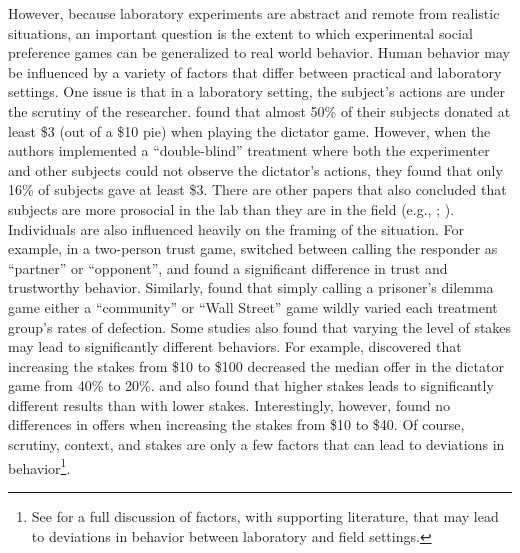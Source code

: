 \documentclass[12pt]{article}
\begin{document}
However, because laboratory experiments are abstract and remote from realistic situations, an important question is the extent to which experimental social preference games can be generalized to real world behavior. Human behavior may be influenced by a variety of factors that differ between practical and laboratory settings. One issue is that in a laboratory setting, the subject's actions are under the scrutiny of the researcher. \cite{hoffman_1994} found that almost 50\% of their subjects donated at least \$3 (out of a \$10 pie) when playing the dictator game. However, when the authors implemented a ``double-blind'' treatment where both the experimenter and other subjects could not observe the dictator\rq s actions, they found that only 16\% of subjects gave at least \$3. There are other papers that also concluded that subjects are more prosocial in the lab than they are in the field (e.g., \cite{list_2006}; \cite{gneezy_2004}). Individuals are also influenced heavily on the framing of the situation. For example, in a two-person trust game, \cite{burnham_mccabe_smith_2000} switched between calling the responder as ``partner'' or ``opponent'', and found a significant difference in trust and trustworthy behavior. Similarly, \cite{ross_ward_1996} found that simply calling a prisoner's dilemma game either a ``community'' or ``Wall Street'' game wildly varied each treatment group\rq s rates of defection. Some studies also found that varying the level of stakes may lead to significantly different behaviors. For example, \cite{carpenter_verhoogen_burks_2005} discovered that increasing the stakes from \$10 to \$100 decreased the median offer in the dictator game from 40\% to 20\%. \cite{slonim_roth_1998} and \cite{parco_rapoport_stein_2002} also found that higher stakes leads to significantly different results than with lower stakes. Interestingly, however, \cite{cherry_frykblom_shogren_2002} found no differences in offers when increasing the stakes from \$10 to \$40. Of course, scrutiny, context, and stakes are only a few factors that can lead to deviations in behavior\footnote{See \cite{levitt_list_2007} for a full discussion of factors, with supporting literature, that may lead to deviations in behavior between laboratory and field settings.}.
 
\end{document}
